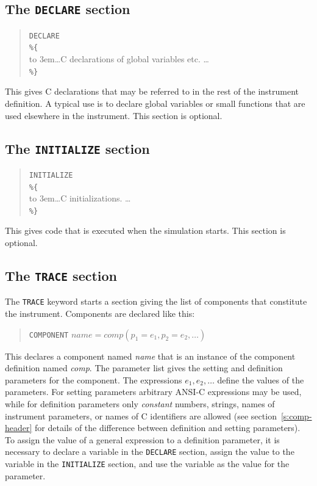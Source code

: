 {\subsection{The \texttt{DECLARE} section}

\begin{quote}
  \texttt{DECLARE} \\
  \verb|%{| \\
  \hbox to 3em{}\ldots C declarations of global variables etc. \ldots \\
  \verb|%}|
\end{quote} 
This gives C declarations that may be referred to in the rest of the
instrument definition. A typical use is to declare global variables or
small functions that are used elsewhere in the instrument. This section
is optional.

\subsection{The \texttt{INITIALIZE} section}

\begin{quote}
  \texttt{INITIALIZE} \\
  \verb|%{| \\
  \hbox to 3em{}\ldots C initializations. \ldots \\
  \verb|%}|
\end{quote} 
This gives code that is executed when the simulation starts. This section is
optional.


\subsection{The \texttt{TRACE} section}

The \texttt{TRACE} keyword starts a section giving the list of
components that constitute the instrument.
Components are declared like this:
\begin{quote}
  \texttt{COMPONENT} $\textit{name} =
    \textit{comp}(p_1 = e_1, p_2 = e_2, \ldots)$
\end{quote}
 
This declares a component named \textit{name} that is an instance of the
component definition named \textit{comp}. The parameter list gives the
setting and definition parameters for the component. The expressions $e_1,
e_2, \ldots$ define the values of the parameters. For setting parameters
arbitrary ANSI-C expressions may be used, while for definition parameters
only \emph{constant} numbers, strings, names of instrument parameters, or names
of C identifiers are allowed (see section~\ref{s:comp-header} for details of
the difference between definition and setting parameters). To assign the
value of a general expression to a definition parameter, it is necessary to
declare a variable in the \texttt{DECLARE} section, assign the value to the
variable in the \texttt{INITIALIZE} section, and use the variable as the
value for the parameter.

}
